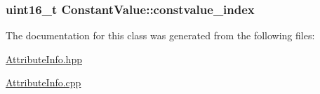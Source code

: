 \subsubsection[{\texorpdfstring{constvalue\+\_\+index}{constvalue_index}}]{\setlength{\rightskip}{0pt plus 5cm}uint16\+\_\+t Constant\+Value\+::constvalue\+\_\+index}\hypertarget{class_constant_value_aaa51c41fc17e11c759e2d0dccbf178e8}{}\label{class_constant_value_aaa51c41fc17e11c759e2d0dccbf178e8}


The documentation for this class was generated from the following files\+:\begin{DoxyCompactItemize}
\item 
\hyperlink{_attribute_info_8hpp}{Attribute\+Info.\+hpp}\item 
\hyperlink{_attribute_info_8cpp}{Attribute\+Info.\+cpp}\end{DoxyCompactItemize}

